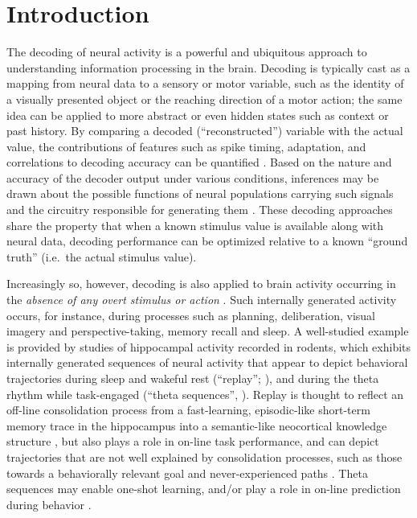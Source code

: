 \documentclass[11pt]{article}
\let\cite=\citep
\let\citeNP=\citealt
\begin{document}
\newpage

\section*{Introduction}

The decoding of neural activity is a powerful and ubiquitous approach
to understanding information processing in the brain. Decoding is
typically cast as a mapping from neural data to a sensory or motor
variable, such as the identity of a visually presented object or the
reaching direction of a motor action; the same idea can be applied to
more abstract or even hidden states such as context or past history.
By comparing a decoded (``reconstructed'') variable with the actual
value, the contributions of features such as spike timing, adaptation,
and correlations to decoding accuracy can be quantified
\cite{Nirenberg2003,Panzeri2015,Schneidman2016}. Based on the nature
and accuracy of the decoder output under various conditions,
inferences may be drawn about the possible functions of neural
populations carrying such signals and the circuitry responsible for
generating them \cite{georgpop,Bialek1991,Pillow2008}. These decoding
approaches share the property that when a known stimulus value is
available along with neural data, decoding performance can be
optimized relative to a known ``ground truth'' (i.e.\ the actual
stimulus value).

Increasingly so, however, decoding is also applied to brain activity
occurring in the {\it absence of any overt stimulus or action}
\cite{Georgopoulos1989,Johnson2009b,King2014}. Such internally
generated activity occurs, for instance, during processes such as
planning, deliberation, visual imagery and perspective-taking, memory
recall and sleep. A well-studied example is provided by studies of
hippocampal activity recorded in rodents, which exhibits internally
generated sequences of neural activity that appear to depict
behavioral trajectories during sleep and wakeful rest (``replay'';
\citeNP{Skaggs1996a,Nadasdy1999,Davidson2009,Pfeiffer2013}),
       {\color{black} and during the theta rhythm while task-engaged
         (``theta sequences'',
         \citeNP{Foster2007,Gupta2012,Chadwick2015})}. Replay is thought
       to reflect an off-line consolidation process from a
       fast-learning, episodic-like short-term memory trace in the
       hippocampus into a semantic-like neocortical knowledge
       structure
       \cite{McClelland1995,Kali2004a,Girardeau2009,Carr2011}, but
       also plays a role in on-line task performance, and can depict
       trajectories that are not well explained by consolidation
       processes, such as those towards a behaviorally relevant goal
       and never-experienced paths
       \cite{O'Neill2006,Jadhav2012,Dragoi2013b,Olafsdottir2015}. {\color{black}
         Theta sequences may enable one-shot learning, and/or play a
         role in on-line prediction during behavior
         \cite{Lisman2009,Malhotra2012,Feng2015}.}
\end{document}
